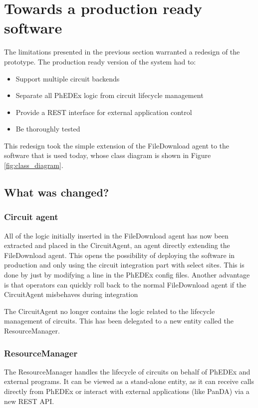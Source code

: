 \section{Towards a production ready software}

The limitations presented in the previous section warranted a redesign of the prototype.
The production ready version of the system had to:
\begin{itemize}
  \item Support multiple circuit backends
  \item Separate all PhEDEx logic from circuit lifecycle management
  \item Provide a REST interface for external application control
  \item Be thoroughly tested
\end{itemize}

This redesign took the simple extension of the FileDownload agent to the 
software that is used today, whose class diagram is shown in Figure \ref{fig:class_diagram}.

\subsection{What was changed?}

\subsubsection{Circuit agent}

All of the logic initially inserted in the FileDownload agent has now been extracted and 
placed in the CircuitAgent, an agent directly extending the FileDownload agent. This opens 
the possibility of deploying the software in production and only using the circuit integration 
part with select sites. This is done by just by modifying a line in the PhEDEx config files.
Another advantage is that operators can quickly roll back to the normal FileDownload agent 
if the CircuitAgent misbehaves during integration

The CircuitAgent no longer contains the logic related to the lifecycle management of circuits.
This has been delegated to a new entity called the ResourceManager.

\subsubsection{ResourceManager}

The ResourceManager handles the lifecycle of circuits on behalf of PhEDEx and external programs.
It can be viewed as a stand-alone entity, as it can receive calls directly from PhEDEx or 
interact with external applications (like PanDA) via a new REST API.

